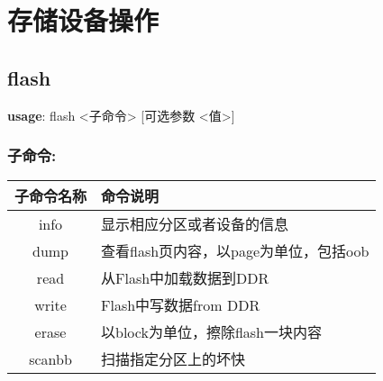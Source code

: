 \section{存储设备操作}

\subsection{flash}
\textbf{usage}: flash <子命令> [可选参数 <值>]

\subsubsection{子命令:}
\begin{table}[H]
\setlength{\parindent}{0pt}
\begin{tabular}{|c|l|} \hline
子命令名称 & 命令说明 \\ \hline
info & 显示相应分区或者设备的信息 \\ \hline
dump & 查看flash页内容，以page为单位，包括oob \\ \hline
read & 从Flash中加载数据到DDR \\ \hline
write & Flash中写数据from DDR \\ \hline
erase & 以block为单位，擦除flash一块内容 \\ \hline
scanbb & 扫描指定分区上的坏快 \\ \hline
\end{tabular}
\end{table}

